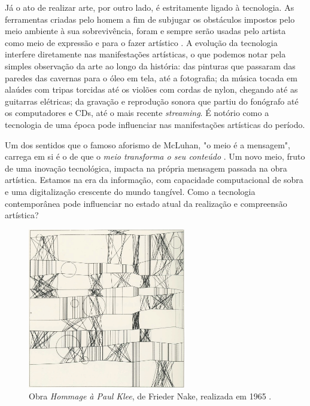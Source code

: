 \documentclass[12pt, a4paper]{article}
\begin{document}
Já o ato de realizar arte, por outro lado, é estritamente ligado à tecnologia.
As ferramentas criadas pelo homem a fim de subjugar os obstáculos impostos
pelo meio ambiente à sua sobrevivência, foram e sempre serão usadas pelo artista como meio de expressão e para o fazer artístico \cite{gouzouasis}.
A evolução da tecnologia interfere diretamente nas manifestações artísticas, o que podemos notar pela simples observação da arte ao longo da história: das pinturas que passaram das paredes das cavernas para o óleo em tela, até
a fotografia; da música tocada em alaúdes com tripas torcidas até os violões com cordas de nylon, chegando até as guitarras elétricas; 
da gravação e reprodução sonora que partiu do fonógrafo até os computadores e CDs, até o mais recente \emph{streaming}. 
É notório como a tecnologia de uma época pode influenciar nas manifestações artísticas do período. 

Um dos sentidos que o famoso aforismo de McLuhan, "o meio é a mensagem", carrega em si é o de que o 
\emph{meio transforma o seu conteúdo} \cite[p.50]{braga_mcluhan}. 
Um novo meio, fruto de uma inovação tecnológica, impacta na própria mensagem passada na obra artística.
Estamos na era da informação, com capacidade computacional de sobra e uma digitalização crescente do mundo tangível. 
Como a tecnologia contemporânea pode influenciar no estado atual da realização e compreensão artística?

\begin{figure}[ht!]
	\centering
	\includegraphics[width=\textwidth, height=7cm, keepaspectratio=true]{fig/hommage_to_paul_klee}
	\caption{
		Obra \emph{Hommage à Paul Klee}, de Frieder Nake, realizada em 1965 \cite{homage_to_paul_klee}.
	}
\end{figure}
\end{document}
